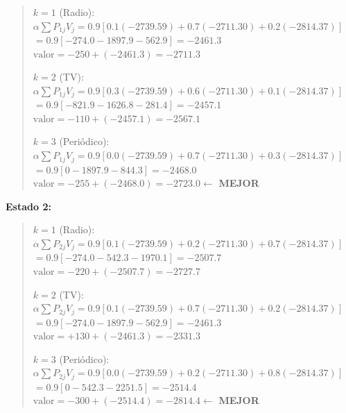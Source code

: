 \documentclass[12pt,a4paper]{article}
\begin{document}
\begin{quote}\footnotesize
$k=1$ (Radio):\;
$\alpha\sum P_{1j}V_j = 0.9[0.1(-2739.59) + 0.7(-2711.30) + 0.2(-2814.37)]$ \\
\hspace*{1.8cm} $= 0.9[-274.0 - 1897.9 - 562.9] = -2461.3$ \\
\hspace*{1.8cm} $\text{valor} = -250 + (-2461.3) = -2711.3$

\vspace{3pt}
$k=2$ (TV):\;
$\alpha\sum P_{1j}V_j = 0.9[0.3(-2739.59) + 0.6(-2711.30) + 0.1(-2814.37)]$ \\
\hspace*{1.8cm} $= 0.9[-821.9 - 1626.8 - 281.4] = -2457.1$ \\
\hspace*{1.8cm} $\text{valor} = -110 + (-2457.1) = -2567.1$

\vspace{3pt}
$k=3$ (Periódico):\;
$\alpha\sum P_{1j}V_j = 0.9[0.0(-2739.59) + 0.7(-2711.30) + 0.3(-2814.37)]$ \\
\hspace*{1.8cm} $= 0.9[0 - 1897.9 - 844.3] = -2468.0$ \\
\hspace*{1.8cm} $\text{valor} = -255 + (-2468.0) = \mathbf{-2723.0}$\quad $\leftarrow$ \textbf{MEJOR}
\end{quote}

\vspace{0.3cm}
\textbf{Estado 2:}

\begin{quote}\footnotesize
$k=1$ (Radio):\;
$\alpha\sum P_{2j}V_j = 0.9[0.1(-2739.59) + 0.2(-2711.30) + 0.7(-2814.37)]$ \\
\hspace*{1.8cm} $= 0.9[-274.0 - 542.3 - 1970.1] = -2507.7$ \\
\hspace*{1.8cm} $\text{valor} = -220 + (-2507.7) = -2727.7$

\vspace{3pt}
$k=2$ (TV):\;
$\alpha\sum P_{2j}V_j = 0.9[0.1(-2739.59) + 0.7(-2711.30) + 0.2(-2814.37)]$ \\
\hspace*{1.8cm} $= 0.9[-274.0 - 1897.9 - 562.9] = -2461.3$ \\
\hspace*{1.8cm} $\text{valor} = +130 + (-2461.3) = -2331.3$

\vspace{3pt}
$k=3$ (Periódico):\;
$\alpha\sum P_{2j}V_j = 0.9[0.0(-2739.59) + 0.2(-2711.30) + 0.8(-2814.37)]$ \\
\hspace*{1.8cm} $= 0.9[0 - 542.3 - 2251.5] = -2514.4$ \\
\hspace*{1.8cm} $\text{valor} = -300 + (-2514.4) = \mathbf{-2814.4}$\quad $\leftarrow$ \textbf{MEJOR}
\end{quote}
\end{document}
